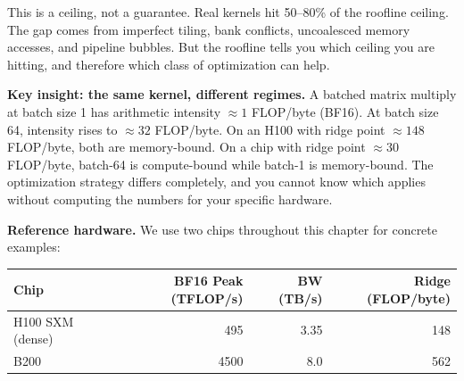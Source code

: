 This is a ceiling, not a guarantee. Real kernels hit 50--80\% of the roofline ceiling. The gap comes from imperfect tiling, bank conflicts, uncoalesced memory accesses, and pipeline bubbles. But the roofline tells you which ceiling you are hitting, and therefore which class of optimization can help.

\textbf{Key insight: the same kernel, different regimes.} A batched matrix multiply at batch size 1 has arithmetic intensity $\approx 1$ FLOP/byte (BF16). At batch size 64, intensity rises to $\approx 32$ FLOP/byte. On an H100 with ridge point $\approx 148$ FLOP/byte, both are memory-bound. On a chip with ridge point $\approx 30$ FLOP/byte, batch-64 is compute-bound while batch-1 is memory-bound. The optimization strategy differs completely, and you cannot know which applies without computing the numbers for your specific hardware.

\textbf{Reference hardware.} We use two chips throughout this chapter for concrete examples:

\begin{center}
\small
\begin{tabular}{@{}lrrr@{}}
\toprule
\textbf{Chip} & \textbf{BF16 Peak (TFLOP/s)} & \textbf{BW (TB/s)} & \textbf{Ridge (FLOP/byte)} \\
\midrule
H100 SXM (dense) & 495 & 3.35 & 148 \\
B200             & 4500 & 8.0 & 562 \\
\bottomrule
\end{tabular}
\end{center}

